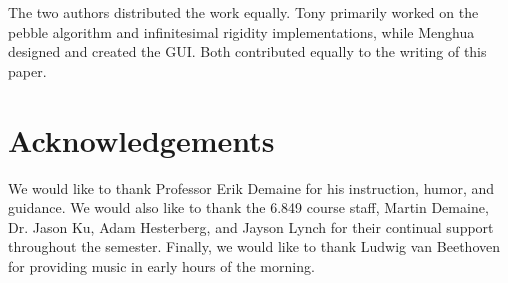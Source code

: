 \documentclass[aps,prd,final,twocolumn,letterpaper,nofootinbib]{revtex4-1}
\begin{document}
The two authors distributed the work equally.
Tony primarily worked on the pebble algorithm and infinitesimal rigidity implementations,
while Menghua designed and created the GUI.
Both contributed equally to the writing of this paper.

\section*{Acknowledgements}

We would like to thank Professor Erik Demaine for his instruction,
humor, and guidance. We would also like to thank the 6.849 course staff,
Martin Demaine, Dr. Jason Ku, Adam Hesterberg, and Jayson Lynch
for their continual support throughout the semester.
Finally, we would like to thank Ludwig van Beethoven for providing
music in early hours of the morning.

{}

\end{document}
